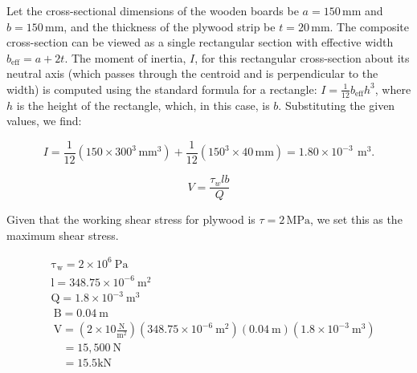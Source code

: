 \documentclass[12pt]{article}
\begin{document}
Let the cross-sectional dimensions of the wooden boards be \(a = 150 \, \text{mm}\) and \(b = 150 \, \text{mm}\), and the thickness of the plywood strip be \(t = 20 \, \text{mm}\). The composite cross-section can be viewed as a single rectangular section with effective width \(b_{\text{eff}} = a + 2t\). The moment of inertia, \(I\), for this rectangular cross-section about its neutral axis (which passes through the centroid and is perpendicular to the width) is computed using the standard formula for a rectangle: \(I = \frac{1}{12} b_{\text{eff}} h^3\), where \(h\) is the height of the rectangle, which, in this case, is \(b\). Substituting the given values, we find:

\[
I = \frac{1}{12} (150 \times 300^3  \, \text{mm}^3) + \frac{1}{12}(150^3 \times 40 \, \text{mm})= 1.80 \times 10^{-3} \, \mathrm{~m}^3.
\]

\[
 V=\frac{\tau_w l b}{Q}
\]

Given that the working shear stress for plywood is \(\tau = 2 \, \text{MPa}\), we set this as the maximum shear stress.


\[
\begin{aligned}
& \mathrm{\tau}_{\mathrm{w}}=2 \times 10^6 \mathrm{~Pa} \\
& \mathrm{l}=348.75 \times 10^{-6} \mathrm{~m}^2 \\
& \mathrm{Q}=1.8 \times 10^{-3} \mathrm{~m}^3 \\
& \mathrm{~B}=0.04 \mathrm{~m} \\
& \mathrm{~V}=\left(2 \times 10 \frac{\mathrm{N}}{\mathrm{m}^2}\right)\left(348.75 \times 10^{-6} \mathrm{~m}^2\right)(0.04 \mathrm{~m})\left(1.8 \times 10^{-3} \mathrm{~m}^3\right) \\
& \quad=15,500 \mathrm{~N} \\
& \quad=15.5 \mathrm{kN}
\end{aligned}
\]
\end{document}
